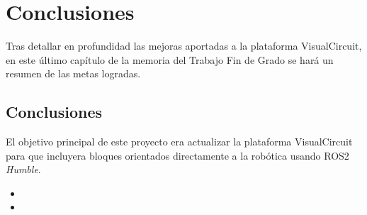 \chapter{Conclusiones}
\label{cap:capitulo7}

Tras detallar en profundidad las mejoras aportadas a la plataforma VisualCircuit, en este último capítulo de la memoria del
Trabajo Fin de Grado se hará un resumen de las metas logradas.

\section{Conclusiones}

El objetivo principal de este proyecto era actualizar la plataforma VisualCircuit para que incluyera bloques orientados directamente a
la robótica usando ROS2 \textit{Humble}.

\begin{itemize}
	\item 
	\item 
\end{itemize}
